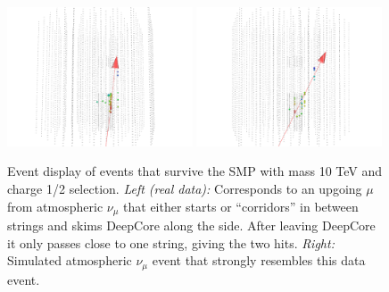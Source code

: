 \begin{appendices}
\begin{figure}
\centering
\includegraphics[width=0.49\textwidth]{appendix/img/FINAL_data_m_10000_ch1ovr2_2.png}
\includegraphics[width=0.49\textwidth]{appendix/img/FINAL_data_m_10000_ch1ovr2_2_NUMUANALOGY.png}
\caption{Event display of events that survive the SMP with mass 10 TeV and charge 1/2 selection. \textit{Left (real data): }Corresponds to an upgoing $\mu$ from atmospheric $\nu_\mu$ that either starts or ``corridors'' in between strings and skims DeepCore along the side. After leaving DeepCore it only passes close to one string, giving the two hits. \textit{Right: }Simulated atmospheric $\nu_\mu$ event that strongly resembles this data event.}
\label{fig:final_1}
\end{figure}


\end{appendices}
